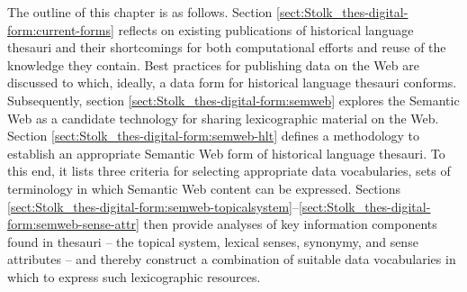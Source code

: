 The outline of this chapter is as follows. Section \ref{sect:Stolk_thes-digital-form:current-forms} reflects on existing publications of historical language thesauri and their shortcomings for both computational efforts and reuse of the knowledge they contain. Best practices for publishing data on the Web are discussed to which, ideally, a data form for historical language thesauri conforms. Subsequently, section \ref{sect:Stolk_thes-digital-form:semweb} explores the Semantic Web as a candidate technology for sharing lexicographic material on the Web. %
Section \ref{sect:Stolk_thes-digital-form:semweb-hlt} defines a methodology to establish an appropriate Semantic Web form of historical language thesauri. To this end, it lists three criteria for selecting appropriate data vocabularies, sets of terminology in which Semantic Web content can be expressed. 
Sections \ref{sect:Stolk_thes-digital-form:semweb-topicalsystem}--\ref{sect:Stolk_thes-digital-form:semweb-sense-attr} then provide analyses of key information components found in thesauri -- the topical system, lexical senses, synonymy, and sense attributes -- and thereby construct a combination of suitable data vocabularies in which to express such lexicographic resources.


